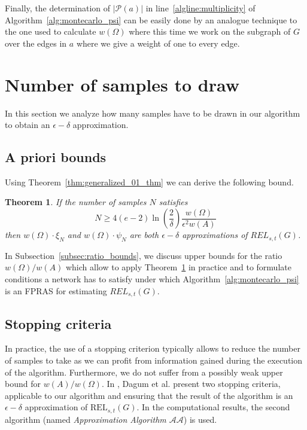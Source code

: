 \documentclass{article}
\newtheorem{theorem}{Theorem}
\begin{document}
Finally, the determination of $|\mathcal{P}(a)|$ in
line~\ref{algline:multiplicity} of Algorithm~\ref{alg:montecarlo_psi}
can be easily done by an
analogue technique to the one used to calculate $w(\Omega)$
where this time we work on the subgraph of $G$ over the edges in
$a$ where we give a weight of one to every edge.

\section{Number of samples to draw}\label{sec:nb_samples}

In this section we analyze how many samples have to be drawn
in our algorithm to obtain an $\epsilon-\delta$ approximation.

\subsection{A priori bounds}

Using Theorem~\ref{thm:generalized_01_thm} we can derive the following bound.

\begin{theorem}\label{thm:montecarlo_importance_approx}
If the number of samples $N$ satisfies
\begin{equation*}
N\geq 4(e-2)\ln\left(\frac{2}{\delta}\right) \frac{w(\Omega)}{\epsilon^2 w(A)}
\end{equation*}
then $w(\Omega)\cdot\xi_N$ and $w(\Omega)\cdot \psi_N$ are both
$\epsilon-\delta$ approximations of $\mathit{REL}_{s,t}(G)$.
\end{theorem}

In Subsection~\ref{subsec:ratio_bounds}, we discuss upper bounds
for the ratio $w(\Omega)/w(A)$ which allow to apply
Theorem~\ref{thm:montecarlo_importance_approx} in practice and
to formulate conditions a network has to satisfy under which
Algorithm~\ref{alg:montecarlo_psi} is an FPRAS for
estimating $\mathit{REL}_{s,t}(G)$.

\subsection{Stopping criteria}

In practice, the use of a stopping
criterion typically allows to reduce the number of samples to
take as
we can profit from information gained during the execution
of the algorithm. Furthermore, we do not suffer from a possibly
weak upper bound for $w(A)/w(\Omega)$.
In \cite{dagum_2000_optimal}, Dagum et al. present two stopping criteria,
applicable to our algorithm and ensuring that
the result of the algorithm is an $\epsilon-\delta$ approximation
of $\mathrm{REL}_{s,t}(G)$. In the computational results, the second
algorithm (named \textit{Approximation Algorithm $\mathcal{AA}$}) is
used.
\end{document}
